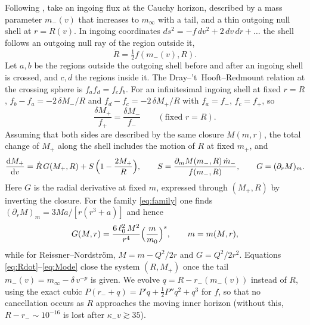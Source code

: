 \documentclass[11pt]{article}
\newcommand{\dd}{\mathrm{d}}
\begin{document}
Following \citet{Ori1991}, take an ingoing flux at the Cauchy horizon, described by a mass parameter $m_-(v)$ that increases to $m_\infty$ with a tail, and a thin outgoing null shell at $r=R(v)$. In ingoing coordinates $ds^2=-f\,dv^2+2\,dv\,dr+\dots$ the shell follows an outgoing null ray of the region outside it,
\begin{equation}
\dot R=\tfrac12 f(m_-(v),R).
\label{eq:Rdot}
\end{equation}
Let $a,b$ be the regions outside the outgoing shell before and after an ingoing shell is crossed, and $c,d$ the regions inside it. The Dray--'t~Hooft--Redmount relation \citep{DrayTHooft1985,Redmount1985,BarrabesIsrael1991} at the crossing sphere is $f_af_d=f_cf_b$. For an infinitesimal ingoing shell at fixed $r=R$, $f_b-f_a=-2\,\delta M_-/R$ and $f_d-f_c=-2\,\delta M_+/R$ with $f_a=f_-$, $f_c=f_+$, so
\begin{equation}
\frac{\delta M_+}{f_+}=\frac{\delta M_-}{f_-}\qquad(\text{fixed }r=R).
\label{eq:dtr}
\end{equation}
Assuming that both sides are described by the same closure $M(m,r)$, the total change of $M_+$ along the shell includes the motion of $R$ at fixed $m_+$, and
\begin{equation}
\frac{\dd M_+}{\dd v}=\dot R\,G(M_+,R)+S\,\Bigl(1-\frac{2M_+}{R}\Bigr),\qquad S=\frac{\partial_mM(m_-,R)\,\dot m_-}{f(m_-,R)},\qquad G=(\partial_rM)_m .
\label{eq:Mode}
\end{equation}
Here $G$ is the radial derivative at fixed $m$, expressed through $(M_+,R)$ by inverting the closure. For the family \eqref{eq:family} one finds $(\partial_rM)_m=3Ma/[r(r^3+a)]$ and hence
\begin{equation}
G(M,r)=\frac{6\,\ell_0^2\,M^2}{r^4}\Bigl(\frac{m}{m_0}\Bigr)^{s},\qquad m=m(M,r),
\label{eq:Gfamily}
\end{equation}
while for Reissner--Nordstr\"om, $M=m-Q^2/2r$ and $G=Q^2/2r^2$. Equations \eqref{eq:Rdot}--\eqref{eq:Mode} close the system $(R,M_+)$ once the tail $m_-(v)=m_\infty-\delta\,v^{-p}$ is given. We evolve $q=R-r_-(m_-(v))$ instead of $R$, using the exact cubic $P(r_-+q)=P'q+\tfrac12P''q^2+q^3$ for $f$, so that no cancellation occurs as $R$ approaches the moving inner horizon (without this, $R-r_-\sim10^{-16}$ is lost after $\kappa_-v\gtrsim35$).
\end{document}
